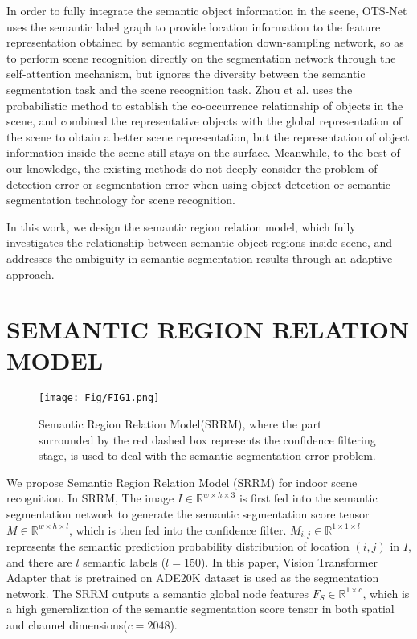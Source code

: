 \documentclass[conference]{IEEEtran}
\begin{document}
In order to fully integrate the semantic object information in the scene, OTS-Net\cite{ref16} uses the semantic label graph to provide location information to the feature representation obtained by semantic segmentation down-sampling network, so as to perform scene recognition directly on the segmentation network through the self-attention mechanism, but ignores the diversity between the semantic segmentation task and the scene recognition task. Zhou et al.\cite{ref20} uses the probabilistic method to establish the co-occurrence relationship of objects in the scene, and combined the representative objects with the global representation of the scene to obtain a better scene representation, but the representation of object information inside the scene still stays on the surface. Meanwhile, to the best of our knowledge, the existing methods do not deeply consider the problem of detection error or segmentation error when using object detection or semantic segmentation technology for scene recognition.

In this work, we design the semantic region relation model, which fully investigates the relationship between semantic object regions inside scene, and addresses the ambiguity in semantic segmentation results through an adaptive approach.

\section{SEMANTIC REGION RELATION MODEL}

\begin{figure*}[htbp]
    \centering
    \texttt{[image: Fig/FIG1.png]}
    \caption{Semantic Region Relation Model(SRRM), where the part surrounded by the red dashed box represents the confidence filtering stage, is used to deal with the semantic segmentation error problem.}
    \label{Fig1}
\end{figure*}

We propose Semantic Region Relation Model (SRRM) for indoor scene recognition. In SRRM, The image $I \in \mathbb{R}^{w \times h \times 3}$ is first fed into the semantic segmentation network to generate the semantic segmentation score tensor $M \in \mathbb{R}^{w \times h \times l}$, which is then fed into the confidence filter. ${M_{i,j}} \in \mathbb{R}^{1 \times 1 \times l}$ represents the semantic prediction probability distribution of location $(i,j)$ in $I$, and there are $l$ semantic labels ($l=150$).  In this paper, Vision Transformer Adapter \cite{ref22} that is pretrained on ADE20K dataset\cite{ref23} is used as the segmentation network. The SRRM outputs a semantic global node features ${F_S} \in \mathbb{R}^{1 \times c}$, which is a high generalization of the semantic segmentation score tensor in both spatial and channel dimensions($c=2048$).
\end{document}
